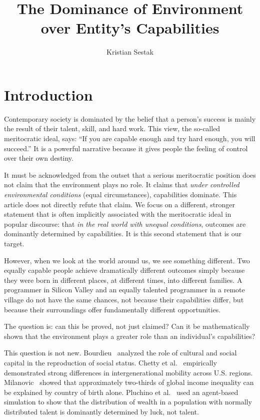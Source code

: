 \documentclass[12pt,a4paper]{article}
\title{The Dominance of Environment over Entity's Capabilities}
\author{Kristian Sestak}
\date{}
\begin{document}
\maketitle

\section{Introduction}

Contemporary society is dominated by the belief that a person's success is mainly the result of their talent, skill, and hard work. This view, the so-called meritocratic ideal, says: ``If you are capable enough and try hard enough, you will succeed.'' It is a powerful narrative because it gives people the feeling of control over their own destiny.

It must be acknowledged from the outset that a serious meritocratic position does not claim that the environment plays no role. It claims that \emph{under controlled environmental conditions} (equal circumstances), capabilities dominate. This article does not directly refute that claim. We focus on a different, stronger statement that is often implicitly associated with the meritocratic ideal in popular discourse: that \emph{in the real world with unequal conditions}, outcomes are dominantly determined by capabilities. It is this second statement that is our target.

However, when we look at the world around us, we see something different. Two equally capable people achieve dramatically different outcomes simply because they were born in different places, at different times, into different families. A programmer in Silicon Valley and an equally talented programmer in a remote village do not have the same chances, not because their capabilities differ, but because their surroundings offer fundamentally different opportunities.

The question is: can this be proved, not just claimed? Can it be mathematically shown that the environment plays a greater role than an individual's capabilities?

This question is not new. Bourdieu~\cite{bourdieu1986} analyzed the role of cultural and social capital in the reproduction of social status. Chetty et al.~\cite{chetty2014} empirically demonstrated strong differences in intergenerational mobility across U.S. regions. Milanovic~\cite{milanovic2015} showed that approximately two-thirds of global income inequality can be explained by country of birth alone. Pluchino et al.~\cite{pluchino2018} used an agent-based simulation to show that the distribution of wealth in a population with normally distributed talent is dominantly determined by luck, not talent.
\end{document}
